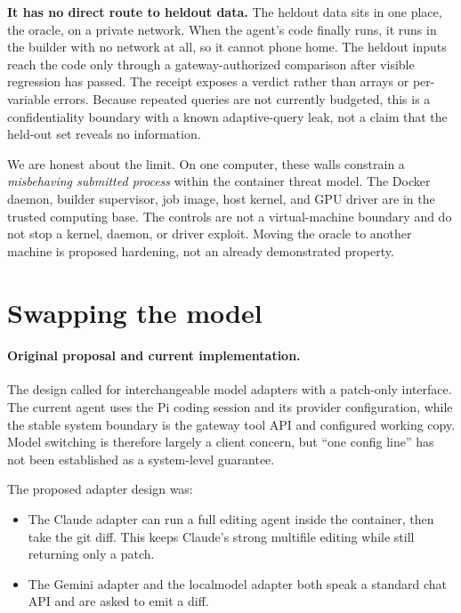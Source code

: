\documentclass[11pt]{article}
\begin{document}
\textbf{It has no direct route to held\-out data.} The held\-out data sits in one place,
the oracle, on a private network. When the agent's code finally runs, it runs in
the builder with no network at all, so it cannot phone home. The held\-out inputs
reach the code only through a gateway-authorized comparison after visible
regression has passed. The receipt exposes a verdict rather than arrays or
per-variable errors. Because repeated queries are not currently budgeted, this
is a confidentiality boundary with a known adaptive-query leak, not a claim that
the held-out set reveals no information.

We are honest about the limit. On one computer, these walls constrain a
\emph{misbehaving submitted process} within the container threat model. The
Docker daemon, builder supervisor, job image, host kernel, and GPU driver are in
the trusted computing base. The controls are not a virtual-machine boundary and
do not stop a kernel, daemon, or driver exploit. Moving the oracle to another
machine is proposed hardening, not an already demonstrated property.

\section{Swapping the model}

\paragraph{Original proposal and current implementation.}
The design called for interchangeable model adapters with a patch-only
interface. The current agent uses the Pi coding session and its provider
configuration, while the stable system boundary is the gateway tool API and
configured working copy. Model switching is therefore largely a client concern,
but ``one config line'' has not been established as a system-level guarantee.

The proposed adapter design was:

\begin{itemize}[leftmargin=1.2em, itemsep=0.15em]
  \item The Claude adapter can run a full editing agent inside the container,
  then take the git diff. This keeps Claude's strong multi\-file editing while
  still returning only a patch.
  \item The Gemini adapter and the local\-model adapter both speak a standard
  chat API and are asked to emit a diff.
\end{itemize}
\end{document}
